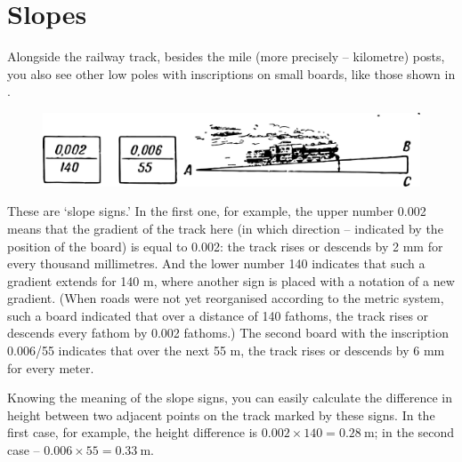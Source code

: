 \section{Slopes}
\label{sec-4.3}

Alongside the railway track, besides the mile (more precisely -- kilometre) posts, you also see other low poles with inscriptions on small boards, like those shown in .

\begin{figure}[h!]
\centering
\includegraphics[width=\textwidth]{figures/ch-04/fig-081.pdf}
\end{figure}


These are `slope signs.' In the first one, for example, the upper number 0.002 means that the gradient of the track here (in which direction -- indicated by the position of the board) is equal to 0.002: the track rises or descends by 2 mm for every thousand millimetres. And the lower number 140 indicates that such a gradient extends for 140 m, where another sign is placed with a notation of a new gradient. (When roads were not yet reorganised according to the metric system, such a board indicated that over a distance of 140 fathoms, the track rises or descends every fathom by 0.002 fathoms.) The second board with the inscription 0.006/55 indicates that over the next 55 m, the track rises or descends by 6 mm for every meter.

Knowing the meaning of the slope signs, you can easily calculate the difference in height between two adjacent points on the track marked by these signs. In the first case, for example, the height difference is $0.002 \times 140 = \SI{0.28}{\meter}$; in the second case -- $0.006 \times 55 = \SI{0.33}{\meter}$.

